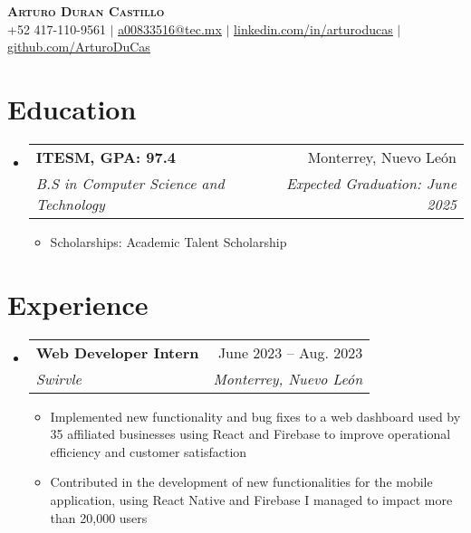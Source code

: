\documentclass[letterpaper,11pt]{article}
\makeatletter
\newcommand{\resumeItem}[1]{
    \item\small{
            {#1 \vspace{-2pt}}
    }
}
\newcommand{\resumeSubheading}[4]{
    \vspace{-2pt}\item
    \begin{tabular*}{0.97\textwidth}[t]{l@{\extracolsep{\fill}}r}
        \textbf{#1} & #2 \\
        \textit{\small#3} & \textit{\small #4} \\
    \end{tabular*}\vspace{-7pt}
}
\newcommand{\resumeSubHeadingListStart}{\begin{itemize}[leftmargin=0.15in, label={}]}
\newcommand{\resumeSubHeadingListEnd}{\end{itemize}}
\newcommand{\resumeItemListStart}{\begin{itemize}}
\newcommand{\resumeItemListEnd}{\end{itemize}\vspace{-5pt}}
\makeatother
\begin{document}

\begin{center}
\textbf{\Huge \scshape Arturo Duran Castillo} \\ \vspace{1pt}
\small +52 417-110-9561 $|$ \href{mailto:a00833516@tec.mx}{\underline{a00833516@tec.mx}} $|$
\href{https://www.linkedin.com/in/arturoducas/}{\underline{linkedin.com/in/arturoducas}} $|$
\href{https://github.com/ArturoDuCas}{\underline{github.com/ArturoDuCas}}
\end{center}


\section{Education}
\resumeSubHeadingListStart
\resumeSubheading
{ITESM, GPA: 97.4}{Monterrey, Nuevo León}
{B.S in Computer Science and Technology}{Expected Graduation: June 2025}
\resumeItemListStart
\resumeItem{Scholarships: Academic Talent Scholarship}
\resumeItemListEnd
\resumeSubHeadingListEnd



\section{Experience}
\resumeSubHeadingListStart

\resumeSubheading
{Web Developer Intern}{June 2023 -- Aug. 2023}
{Swirvle}{Monterrey, Nuevo León}
\resumeItemListStart
\resumeItem{Implemented new functionality and bug fixes to a web dashboard used by 35 affiliated businesses using React and Firebase to improve operational efficiency and customer satisfaction}
\resumeItem{Contributed in the development of new functionalities for the mobile application, using React Native and Firebase I managed to impact more than 20,000 users}
\resumeItemListEnd

\resumeSubHeadingListEnd
\end{document}

